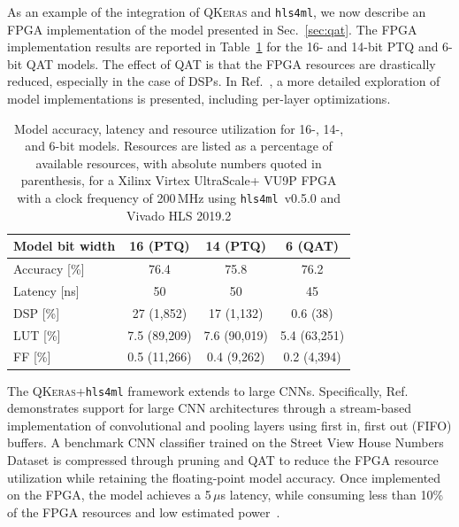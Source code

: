 \documentclass[tinyml]{acmart}
\newcommand{\hlsfml}{\texttt{hls4ml}\xspace}
\begin{document}
As an example of the integration of \textsc{QKeras} and \hlsfml, we now describe an FPGA implementation of the model presented in Sec.~\ref{sec:qat}.
The FPGA implementation results are reported in Table~\ref{tab:performance} for the 16- and 14-bit PTQ and 6-bit QAT models.
The effect of QAT is that the FPGA resources are drastically reduced, especially in the case of DSPs.
In Ref.~\cite{Coelho:2020zfu}, a more detailed exploration of model implementations is presented, including per-layer optimizations.

\begin{table}[t!]
\centering
\begin{tabular}{l|ccc}
\toprule
Model bit width & 16 (PTQ) & 14 (PTQ) & 6 (QAT) \\
\midrule
Accuracy [\%] & 76.4 & 75.8 & 76.2 \\
Latency [ns] & 50 & 50 & 45 \\
DSP [\%]  & 27 (1,852) & 17 (1,132) & 0.6 (38) \\
LUT [\%]  & 7.5 (89,209) & 7.6 (90,019) & 5.4 (63,251) \\
FF [\%]  & 0.5 (11,266) & 0.4 (9,262) & 0.2 (4,394) \\
\bottomrule
\end{tabular}
\caption{Model accuracy, latency and resource utilization for 16-, 14-, and 6-bit models.
Resources are listed as a percentage of available resources, with absolute numbers quoted in parenthesis, for a Xilinx Virtex UltraScale+ VU9P FPGA with a clock frequency of 200\,MHz using \hlsfml~v0.5.0 and Vivado HLS 2019.2}
\vspace{-0.5cm}
\label{tab:performance}
\end{table}

The \textsc{QKeras}+\hlsfml framework extends to large CNNs.
Specifically, Ref.~\cite{Aarrestad:2021zos} demonstrates support for large CNN architectures through a stream-based implementation of convolutional and pooling layers using first in, first out (FIFO) buffers.
A benchmark CNN classifier trained on the Street View House Numbers Dataset is compressed through pruning and QAT to reduce the FPGA resource utilization while retaining the floating-point model accuracy.
Once implemented on the FPGA, the model achieves a 5\,$\mu$s latency, while consuming less than 10\% of the FPGA resources and low estimated power~\cite{ComputingsEnergy}.

\end{document}
